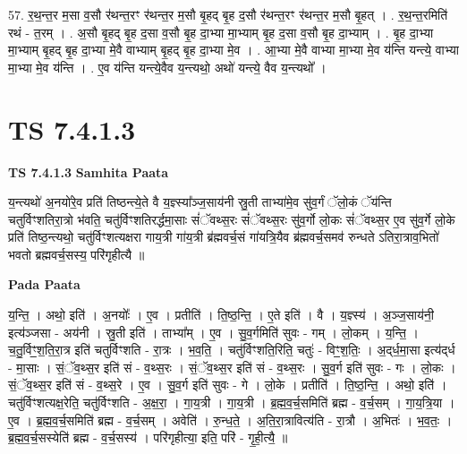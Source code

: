 \documentclass[17pt]{extarticle}
\begin{document}
57. र॒थ॒न्त॒र म॒सा व॒सौ र॑थन्त॒रꣳ र॑थन्त॒र म॒सौ बृ॒हद् बृ॒ह द॒सौ र॑थन्त॒रꣳ र॑थन्त॒र म॒सौ बृ॒हत् । . र॒थ॒न्त॒रमिति॑ रथं - त॒रम् । . अ॒सौ बृ॒हद् बृ॒ह द॒सा व॒सौ बृ॒ह दा॒भ्या मा॒भ्याम् बृ॒ह द॒सा व॒सौ बृ॒ह दा॒भ्याम् । . बृ॒ह दा॒भ्या मा॒भ्याम् बृ॒हद् बृ॒ह दा॒भ्या मे॒वै वाभ्याम् बृ॒हद् बृ॒ह दा॒भ्या मे॒व । . आ॒भ्या मे॒वै वाभ्या मा॒भ्या मे॒व य॑न्ति यन्त्ये॒ वाभ्या मा॒भ्या मे॒व य॑न्ति । . ए॒व य॑न्ति यन्त्ये॒वैव य॒न्त्यथो॒ अथो॑ यन्त्ये॒ वैव य॒न्त्यथो᳚ । \newline
\pagebreak
{}

\section{ TS 7.4.1.3 }

\textbf{TS 7.4.1.3 } \newline
\textbf{Samhita Paata} \newline

य॒न्त्यथो॑ अ॒नयो॑रे॒व प्रति॑ तिष्ठन्त्ये॒ते वै य॒ज्ञ्स्या᳚ञ्ज॒साय॑नी स्रु॒ती ताभ्या॑मे॒व सु॑व॒र्गं ॅलो॒कं ॅय॑न्ति चतुर्विꣳशतिरा॒त्रो भ॑वति॒ चतु॑र्विꣳशतिरर्द्धमा॒साः सं॑ॅवथ्स॒रः सं॑ॅवथ्स॒रः सु॑व॒र्गो लो॒कः सं॑ॅवथ्स॒र ए॒व सु॑व॒र्गे लो॒के प्रति॑ तिष्ठ॒न्त्यथो॒ चतु॑र्विꣳशत्यक्षरा गाय॒त्री गा॑य॒त्री ब्र॑ह्मवर्च॒सं गा॑यत्रि॒यैव ब्र॑ह्मवर्च॒समव॑ रुन्धते ऽतिरा॒त्राव॒भितो॑ भवतो ब्रह्मवर्च॒सस्य॒ परि॑गृहीत्यै ॥ \newline

\textbf{Pada Paata} \newline

य॒न्ति॒ । अथो॒ इति॑ । अ॒नयोः᳚ । ए॒व । प्रतीति॑ । ति॒ष्ठ॒न्ति॒ । ए॒ते इति॑ । वै । य॒ज्ञ्स्य॑ । अ॒ञ्ज॒साय॑नी॒ इत्य॑ञ्जसा - अय॑नी । स्रु॒ती इति॑ । ताभ्या᳚म् । ए॒व । सु॒व॒र्गमिति॑ सुवः - गम् । लो॒कम् । य॒न्ति॒ । च॒तु॒र्विꣳ॒॒श॒ति॒रा॒त्र इति॑ चतुर्विꣳशति - रा॒त्रः । भ॒व॒ति॒ । चतु॑र्विꣳशति॒रिति॒ चतुः॑ - विꣳ॒॒श॒तिः॒ । अ॒द्‌र्ध॒मा॒सा इत्य॑द्‌र्ध - मा॒साः । सं॒ॅव॒थ्स॒र इति॑ सं - व॒थ्स॒रः । सं॒ॅव॒थ्स॒र इति॑ सं - व॒थ्स॒रः । सु॒व॒र्ग इति॑ सुवः - गः । लो॒कः । सं॒ॅव॒थ्स॒र इति॑ सं - व॒थ्स॒रे । ए॒व । सु॒व॒र्ग इति॑ सुवः - गे । लो॒के । प्रतीति॑ । ति॒ष्ठ॒न्ति॒ । अथो॒ इति॑ । चतु॑र्विꣳशत्यक्ष॒रेति॒ चतु॑र्विꣳशति - अ॒क्ष॒रा॒ । गा॒य॒त्री । गा॒य॒त्री । ब्र॒ह्म॒व॒र्च॒समिति॑ ब्रह्म - व॒र्च॒सम् । गा॒य॒त्रि॒या । ए॒व । ब्र॒ह्म॒व॒र्च॒समिति॑ ब्रह्म - व॒र्च॒सम् । अवेति॑ । रु॒न्ध॒ते॒ । अ॒ति॒रा॒त्रावित्य॑ति - रा॒त्रौ । अ॒भितः॑ । भ॒व॒तः॒ । ब्र॒ह्म॒व॒र्च॒सस्येति॑ ब्रह्म - व॒र्च॒सस्य॑ । परि॑गृहीत्या॒ इति॒ परि॑ - गृ॒ही॒त्यै॒ ॥  \newline
\end{document}
